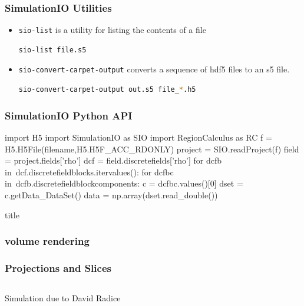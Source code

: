 \documentclass[]{beamer}
\newcommand{\transitionslide}[1]{
  \begin{frame}[plain]
  \vfill
  \centering
  \begin{beamercolorbox}[sep=8pt,center,shadow=true,rounded=true]{title}
    \usebeamerfont{title}{#1}
  \end{beamercolorbox}
  \vfill
\end{frame}
}
\begin{document}
\begin{frame}[fragile]
  \frametitle{SimulationIO Utilities}
  \begin{itemize}
  \item {\color{blue}\lstinline$sio-list$} is a utility for listing the contents of
    a file
\begin{lstlisting}[language=bash]
  sio-list file.s5
\end{lstlisting}
  \item {\color{blue}\lstinline$sio-convert-carpet-output$} converts a
    sequence of hdf5 files to an s5 file.
\begin{lstlisting}[language=bash]
  sio-convert-carpet-output out.s5 file_*.h5
\end{lstlisting}
  \end{itemize}
\end{frame}

\begin{frame}[fragile]
  \frametitle{SimulationIO Python API}
  \begin{python}
    import H5
    import SimulationIO as SIO
    import RegionCalculus as RC
    f = H5.H5File(filename,H5.H5F_ACC_RDONLY)
    project = SIO.readProject(f)
    field = project.fields['rho']
    dcf = field.discretefields['rho']
    for dcfb in\
    dcf.discretefieldblocks.itervalues():
        for dcfbc in\
        dcfb.discretefieldblockcomponents:
            c = dcfbc.values()[0]
            dset = c.getData_DataSet()
            data = np.array(dset.read_double())
  \end{python}
\end{frame}

\transitionslide{\Huge yt}

\begin{frame}
  \frametitle{volume rendering}
  \begin{center}
  \end{center}
\end{frame}

\begin{frame}
  \frametitle{Projections and Slices}
  \begin{columns}
    \column{4cm}
    \begin{center}
      
    \end{center}
    \column{4cm}
    \begin{center}
      
    \end{center}
    \column{4cm}
    \begin{center}
      
    \end{center}    
  \end{columns}
  Simulation due to David Radice
\end{frame}
\end{document}
